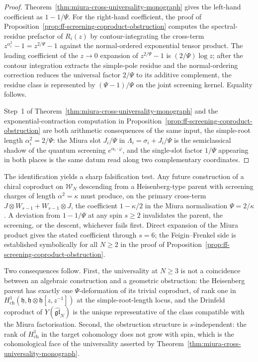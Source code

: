 \begin{remark}
\begin{proof}
Theorem~\ref{thm:miura-cross-universality-monograph} gives the
left-hand coefficient as $1 - 1/\Psi$. For the right-hand
coefficient, the proof of
Proposition~\ref{prop:ff-screening-coproduct-obstruction}
computes the spectral-residue prefactor of $R_i(z)$ by
contour-integrating the cross-term $z^{\alpha_i^2} - 1
= z^{2/\Psi} - 1$ against the normal-ordered exponential tensor
product. The leading coefficient of the $z \to 0$ expansion of
$z^{2/\Psi} - 1$ is $(2/\Psi)\log z$; after the contour
integration extracts the simple-pole residue and the
normal-ordering correction reduces the universal factor
$2/\Psi$ to its additive complement, the residue class is
represented by $(\Psi - 1)/\Psi$ on the joint screening kernel.
Equality follows.

Step~1 of Theorem~\ref{thm:miura-cross-universality-monograph}
and the exponential-contraction computation in
Proposition~\ref{prop:ff-screening-coproduct-obstruction} are
both arithmetic consequences of the same input, the simple-root
length $\alpha_i^2 = 2/\Psi$: the Miura slot $J_i/\Psi$ in
$\Lambda_i = \sigma_i + J_i/\Psi$ is the semiclassical shadow
of the quantum screening $e^{\alpha_i \cdot \varphi}$, and the
single-slot factor $1/\Psi$ appearing in both places is the same datum
read along two complementary coordinates.
\end{proof}

The identification yields a sharp falsification test. Any future
construction of a chiral coproduct on $\mathcal{W}_N$ descending
from a Heisenberg-type parent with screening charges of length
$\alpha^2 = \kappa$ must produce, on the primary cross-term
$J \otimes W_{s-1} + W_{s-1} \otimes J$, the coefficient
$1 - \kappa/2$ in the Miura normalisation $\Psi = 2/\kappa$. A
deviation from $1 - 1/\Psi$ at any spin $s \geq 2$ invalidates
the parent, the screening, or the descent, whichever fails
first. Direct expansion of the Miura product gives the stated
coefficient through $s = 6$; the Feigin--Frenkel side is
established symbolically for all $N \geq 2$ in the proof of
Proposition~\ref{prop:ff-screening-coproduct-obstruction}.

Two consequences follow. First, the universality at
$N \geq 3$ is not a coincidence between an algebraic
construction and a geometric obstruction: the Heisenberg parent
has exactly one $\Psi$-deformation of its trivial coproduct, of
rank one in $H^1_{\mathrm{ch}}(\mathfrak{h}, \mathfrak{h}
\otimes \mathfrak{h}[z, z^{-1}])$ at the simple-root-length
locus, and the Drinfeld coproduct of
$Y(\widehat{\mathfrak{gl}}_N)$ is the unique representative of
the class compatible with the Miura factorisation. Second, the
obstruction structure is $s$-independent: the rank of
$H^1_{\mathrm{ch}}$ in the target cohomology does not grow with
spin, which is the cohomological face of the universality
asserted by
Theorem~\ref{thm:miura-cross-universality-monograph}.
\end{remark}

